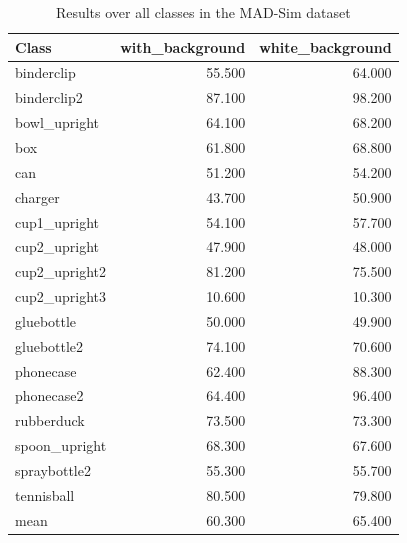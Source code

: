 \begin{table}[!htbp]
\centering
\scriptsize
\setlength{\tabcolsep}{4pt}
\renewcommand{\arraystretch}{0.95}
\begin{tabular}{l r r}
\toprule
\textbf{Class} & \textbf{with\_background} & \textbf{white\_background} \\
\midrule
binderclip & 55.500 & 64.000 \\
binderclip2 & 87.100 & 98.200 \\
bowl\_upright & 64.100 & 68.200 \\
box & 61.800 & 68.800 \\
can & 51.200 & 54.200 \\
charger & 43.700 & 50.900 \\
cup1\_upright & 54.100 & 57.700 \\
cup2\_upright & 47.900 & 48.000 \\
cup2\_upright2 & 81.200 & 75.500 \\
cup2\_upright3 & 10.600 & 10.300 \\
gluebottle & 50.000 & 49.900 \\
gluebottle2 & 74.100 & 70.600 \\
phonecase & 62.400 & 88.300 \\
phonecase2 & 64.400 & 96.400 \\
rubberduck & 73.500 & 73.300 \\
spoon\_upright & 68.300 & 67.600 \\
spraybottle2 & 55.300 & 55.700 \\
tennisball & 80.500 & 79.800 \\
\midrule
mean & 60.300 & 65.400 \\
\bottomrule
\end{tabular}
\caption{Results over all classes in the MAD-Sim dataset}
\label{tab:results\_mad}
\end{table}
